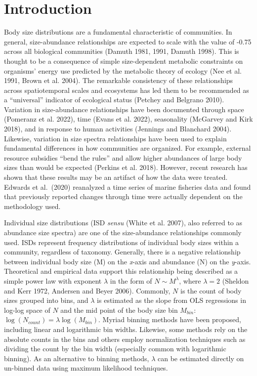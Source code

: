 \documentclass[
]{article}
\begin{document}
\hypertarget{introduction}{%
\section{Introduction}\label{introduction}}

Body size distributions are a fundamental characteristic of communities.
In general, size-abundance relationships are expected to scale with the
value of -0.75 across all biological communities (Damuth 1981, 1991,
Damuth 1998). This is thought to be a consequence of simple
size-dependent metabolic constraints on organisms' energy use predicted
by the metabolic theory of ecology (Nee et al. 1991, Brown et al. 2004).
The remarkable consistency of these relationships across spatiotemporal
scales and ecosystems has led them to be recommended as a ``universal''
indicator of ecological status (Petchey and Belgrano 2010). Variation in
size-abundance relationships have been documented through space
(Pomeranz et al. 2022), time (Evans et al. 2022), seasonality (McGarvey
and Kirk 2018), and in response to human activities (Jennings and
Blanchard 2004). Likewise, variation in size spectra relationships have
been used to explain fundamental differences in how communities are
organized. For example, external resource subsidies ``bend the rules''
and allow higher abundances of large body sizes than would be expected
(Perkins et al. 2018). However, recent research has shown that these
results may be an artifact of how the data were treated. Edwards et
al.~(2020) reanalyzed a time series of marine fisheries data and found
that previously reported changes through time were actually dependent on
the methodology used.

Individual size distributions (ISD \emph{sensu} (White et al. 2007),
also referred to as abundance size spectra) are one of the
size-abundance relationships commonly used. ISDs represent frequency
distributions of individual body sizes within a community, regardless of
taxonomy. Generally, there is a negative relationship between individual
body size (M) on the \emph{x}-axis and abundance (N) on the
\emph{y}-axis. Theoretical and empirical data support this relationship
being described as a simple power law with exponent \(\lambda\) in the
form of \(N \sim M^{\lambda}\), where \(\lambda = 2\) (Sheldon and Kerr
1972, Andersen and Beyer 2006). Commonly, \(N\) is the count of body
sizes grouped into bins, and \(\lambda\) is estimated as the slope from
OLS regressions in log-log space of \(N\) and the mid point of the body
size bin \(M_{bin}\): \(\log(N_{count}) = \lambda \log(M_{bin})\).
Myriad binning methods have been proposed, including linear and
logarithmic bin widths. Likewise, some methods rely on the absolute
counts in the bins and others employ normalization techniques such as
dividing the count by the bin width (especially common with logarithmic
binning). As an alternative to binning methods, \(\lambda\) can be
estimated directly on un-binned data using maximum likelihood
techniques.
\end{document}

